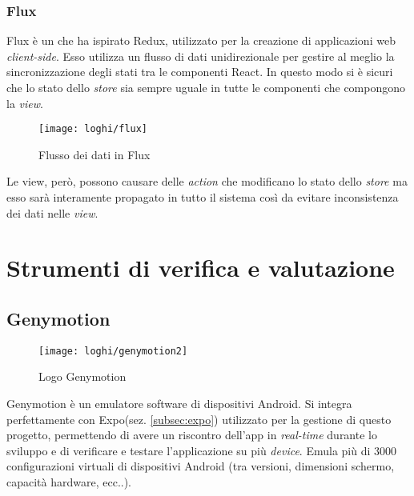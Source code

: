 \subsubsection{Flux} \label{subsubsec:flux}
 Flux è un  che ha ispirato Redux, utilizzato per la 
 creazione di applicazioni web \emph{client-side}. Esso utilizza un flusso di dati 
 unidirezionale per gestire al meglio la sincronizzazione degli stati tra le 
 componenti React. In questo modo si è sicuri che lo stato dello \emph{store} sia 
 sempre uguale in tutte le componenti che compongono la \emph{view}.
 
 \begin{figure}[H] 
 	\centering
 	\texttt{[image: loghi/flux]}
 	\caption{Flusso dei dati in Flux}
 \end{figure}
 Le view, però, possono causare delle \emph{action} che modificano lo stato dello \emph{store} 
 ma esso sarà interamente propagato in tutto il sistema così da evitare 
 inconsistenza dei dati nelle \emph{view}.
 
 
\section{Strumenti di verifica e valutazione}

\subsection{Genymotion} \label{subsez:genymotion}
\begin{figure}[H] 
	\centering
	\texttt{[image: loghi/genymotion2]}
	\caption{Logo Genymotion}
\end{figure}
Genymotion è un emulatore software di dispositivi Android. Si integra 
perfettamente con Expo(sez. \ref{subsec:expo}) utilizzato per la gestione di 
questo progetto, permettendo di avere un riscontro dell'app in \emph{real-time} durante 
lo sviluppo e di verificare e testare l'applicazione su più \emph{device}. Emula più 
di 3000 configurazioni virtuali di dispositivi Android (tra versioni, dimensioni 
schermo, capacità hardware, ecc..). 

